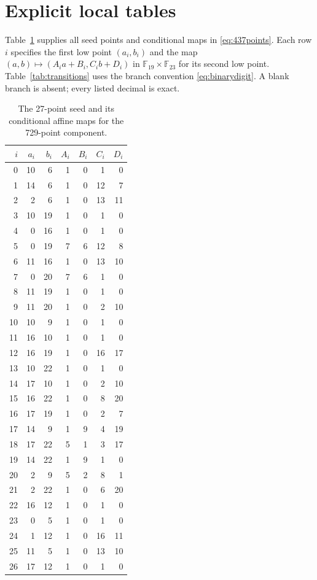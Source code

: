 \documentclass[11pt]{article}
\theoremstyle{definition}
\theoremstyle{remark}
\begin{document}
\appendix
\section{Explicit local tables}\label{app:tables}
Table~\ref{tab:affine} supplies all seed points and conditional maps in
\eqref{eq:437points}. Each row $i$ specifies the first low point
$(a_i,b_i)$ and the map
$(a,b)\mapsto(A_i a+B_i,C_i b+D_i)$ in
$\mathbb F_{19}\times\mathbb F_{23}$ for its second low point.
Table~\ref{tab:transitions} uses the branch convention
\eqref{eq:binarydigit}. A blank branch is absent; every listed decimal
is exact.

\begin{table}[htbp]
\centering\small
\begin{tabular}{rrrrrrr}\toprule
$i$&$a_i$&$b_i$&$A_i$&$B_i$&$C_i$&$D_i$\\\midrule
0&10&6&1&0&1&0\\
1&14&6&1&0&12&7\\
2&2&6&1&0&13&11\\
3&10&19&1&0&1&0\\
4&0&16&1&0&1&0\\
5&0&19&7&6&12&8\\
6&11&16&1&0&13&10\\
7&0&20&7&6&1&0\\
8&11&19&1&0&1&0\\
9&11&20&1&0&2&10\\
10&10&9&1&0&1&0\\
11&16&10&1&0&1&0\\
12&16&19&1&0&16&17\\
13&10&22&1&0&1&0\\
14&17&10&1&0&2&10\\
15&16&22&1&0&8&20\\
16&17&19&1&0&2&7\\
17&14&9&1&9&4&19\\
18&17&22&5&1&3&17\\
19&14&22&1&9&1&0\\
20&2&9&5&2&8&1\\
21&2&22&1&0&6&20\\
22&16&12&1&0&1&0\\
23&0&5&1&0&1&0\\
24&1&12&1&0&16&11\\
25&11&5&1&0&13&10\\
26&17&12&1&0&1&0\\
\bottomrule\end{tabular}
\caption{The 27-point seed and its conditional affine maps for the
729-point component.}\label{tab:affine}
\end{table}
\end{document}
